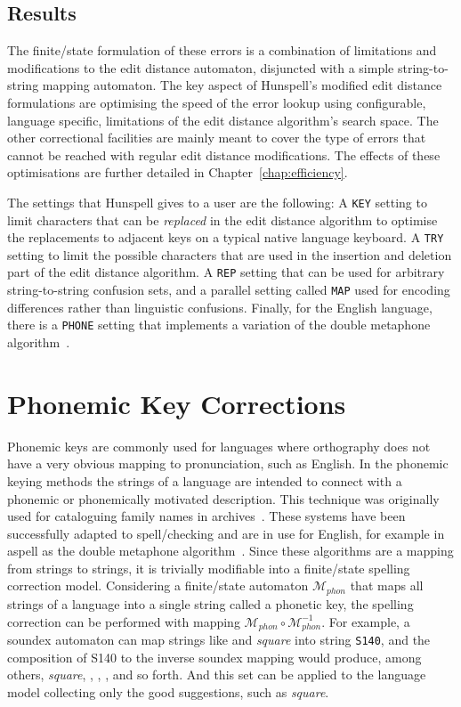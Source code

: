 \documentclass[officiallayout,final]{unihelcompling}
\newcommand\misspelt{\bgroup\markoverwith
{\lower3.5pt\hbox{\sixly \char58}}\ULon}
\newcommand\misspelt{\bgroup\markoverwith
{\textcolor{red}{\lower3.5pt\hbox{\sixly \char58}}}\ULon}
\begin{document}
\subsection{Results}

The finite\-/state formulation of these errors is a combination of limitations
and modifications to the edit distance automaton, disjuncted with a simple
string-to-string mapping automaton. The key aspect of Hunspell's modified edit
distance formulations are optimising the speed of the error lookup using
configurable, language specific, limitations of the edit distance algorithm's
search space. The other correctional facilities are mainly meant to cover the
type of errors that cannot be reached with regular edit distance modifications.
The effects of these optimisations are further detailed in
Chapter~\ref{chap:efficiency}.

The settings that Hunspell gives to a user are the following: A \texttt{KEY}
setting to limit characters that can be \emph{replaced} in the edit distance
algorithm to optimise the replacements to adjacent keys on a typical native
language keyboard. A \texttt{TRY} setting to limit the possible characters
that are used in the insertion and deletion part of the edit distance
algorithm. A \texttt{REP} setting that can be used for arbitrary
string-to-string confusion sets, and a parallel setting called \texttt{MAP}
used for encoding differences rather than linguistic confusions.  Finally, for
the English language, there is a \texttt{PHONE} setting that implements a
variation of the double metaphone algorithm~\citep{philips2000double}.

\section{Phonemic Key Corrections}
\label{sec:phonemic}

Phonemic keys are commonly used for languages where orthography does not have a
very obvious mapping to pronunciation, such as English. In the phonemic keying
methods the strings of a language are intended to connect with a phonemic or
phonemically motivated description. This technique was originally used for
cataloguing family names in archives~\citep{russell1918soundex}. These systems
have been successfully adapted to spell\-/checking and are in use for English,
for example in aspell as the double metaphone
algorithm~\citep{philips2000double}.  Since these algorithms are a mapping from
strings to strings, it is trivially modifiable into a finite\-/state spelling
correction model. Considering a finite\-/state automaton $\mathcal{M}_{phon}$
that maps all strings of a language into a single string called a phonetic key,
the spelling correction can be performed with mapping $\mathcal{M}_{phon} \circ
\mathcal{M}_{phon}^{-1}$.  For example, a soundex automaton can map strings
like \misspelt{squer} and \emph{square} into string \texttt{S140}, and the
composition of S140 to the inverse soundex mapping would produce, among
others, \emph{square}, \misspelt{squer}, \misspelt{sqr}, \misspelt{sqrrr}, and
so forth. And this set can be applied to the language model collecting only the
good suggestions, such as \emph{square}.
\end{document}
